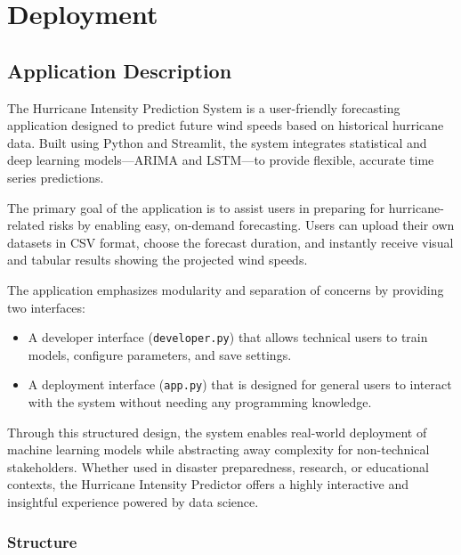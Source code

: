 %
%
%

\chapter{Deployment}

\section{Application Description}

The Hurricane Intensity Prediction System is a user-friendly forecasting application designed to predict future wind speeds based on historical hurricane data. Built using Python and Streamlit, the system integrates statistical and deep learning models—ARIMA and LSTM—to provide flexible, accurate time series predictions.

The primary goal of the application is to assist users in preparing for hurricane-related risks by enabling easy, on-demand forecasting. Users can upload their own datasets in CSV format, choose the forecast duration, and instantly receive visual and tabular results showing the projected wind speeds.

The application emphasizes modularity and separation of concerns by providing two interfaces:

\begin{itemize}
	\item A developer interface (\texttt{developer.py}) that allows technical users to train models, configure parameters, and save settings.
	\item A deployment interface (\texttt{app.py}) that is designed for general users to interact with the system without needing any programming knowledge.
\end{itemize}

Through this structured design, the system enables real-world deployment of machine learning models while abstracting away complexity for non-technical stakeholders. Whether used in disaster preparedness, research, or educational contexts, the Hurricane Intensity Predictor offers a highly interactive and insightful experience powered by data science.


\subsection{Structure}

